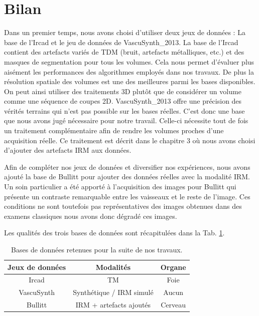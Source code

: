 \section{Bilan}

Dans un premier temps, nous avons choisi d'utiliser deux jeux de données : La base de l'Ircad et le jeu de données de VascuSynth\_2013. La base de l'Ircad contient des artefacts variés de TDM (bruit, artefacts métalliques, etc.) et des masques de segmentation pour tous les volumes. Cela nous permet d'évaluer plus aisément les performances des algorithmes employés dans nos travaux. De plus la résolution spatiale des volumes est une des meilleures parmi les bases disponibles. On peut ainsi utiliser des traitements 3D plutôt que de considérer un volume comme une séquence de coupes 2D. VascuSynth\_2013 offre une précision des vérités terrains qui n'est pas possible sur les bases réelles. C'est donc une base que nous avons jugé nécessaire pour notre travail. Celle-ci nécessite tout de fois un traitement complémentaire afin de rendre les volumes proches d'une acquisition réelle. Ce traitement est décrit dans le chapitre 3 où nous avons choisi d'ajouter des artefacts IRM aux données.

Afin de compléter nos jeux de données et diversifier nos expériences, nous avons ajouté la base de Bullitt pour ajouter des données réelles avec la modalité IRM. Un soin particulier a été apporté à l'acquisition des images pour Bullitt qui présente un contraste remarquable entre les vaisseaux et le reste de l'image. Ces conditions ne sont toutefois pas représentatives des images obtenues dans des examens classiques nous avons donc dégradé ces images.

Les qualités des trois bases de données sont récapitulées dans la Tab. \ref{tab:db_for_exp}.

\begin{table}
    \centering
    \begin{tabular}{ c|c|c }
        \hline
        Jeux de données & Modalités & Organe \\
        \hline
        Ircad           & TM & Foie \\
        VascuSynth      & Synthétique / IRM simulé & Aucun \\
        Bullitt         & IRM + artefacts ajoutés & Cerveau \\
        \hline
    \end{tabular}
    \caption{Bases de données retenues pour la suite de nos travaux.}
    \label{tab:db_for_exp}
  \end{table}


